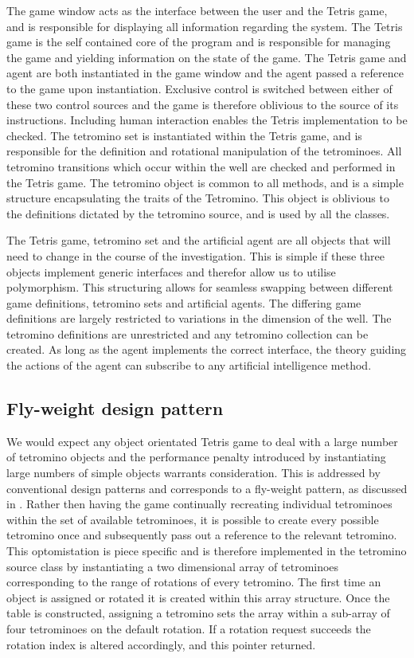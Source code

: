 \documentclass{rucsthesis}
\begin{document}
The game window acts as the interface between the user and the Tetris game, and is responsible for displaying all information regarding the system. The Tetris game is the self contained core of the program and is responsible for managing the game and yielding information on the state of the game. The Tetris game and agent are both instantiated in the game window and the agent passed a reference to the game upon instantiation. Exclusive control is switched between either of these two control sources and the game is therefore oblivious to the source of its instructions.  Including human interaction enables the Tetris implementation to be checked. The tetromino set is instantiated within the Tetris game, and is responsible for the definition and rotational manipulation of the tetrominoes. All tetromino transitions which occur within the well are checked and performed in the Tetris game. The tetromino object is common to all methods, and is a simple structure encapsulating the traits of the Tetromino. This object is oblivious to the definitions dictated by the tetromino source, and is used by all the classes.

The Tetris game, tetromino set and the artificial agent are all objects that will need to change in the course of the investigation. This is simple if these three objects implement generic interfaces and therefor allow us to utilise polymorphism. This structuring allows for seamless swapping between different game definitions, tetromino sets and artificial agents. The differing game definitions are largely restricted to variations in the dimension of the well. The tetromino definitions are unrestricted and any tetromino collection can be created. As long as the agent implements the correct interface, the theory guiding the actions of the agent can subscribe to any artificial intelligence method.

\subsection{Fly-weight design pattern}

We would expect any object orientated Tetris game to deal with a large number of tetromino objects and the performance penalty introduced by instantiating large numbers of simple objects warrants consideration. This is addressed by conventional design patterns and corresponds to a fly-weight pattern, as discussed in \cite{designp}. Rather then having the game continually recreating individual tetrominoes within the set of available tetrominoes, it is possible to create every possible tetromino once and subsequently pass out a reference to the relevant tetromino. This optomistation is piece specific and is therefore implemented in the tetromino source class by instantiating a two dimensional array of tetrominoes corresponding to the range of rotations of every tetromino. The first time an object is assigned or rotated it is created within this array structure. Once the table is constructed, assigning a tetromino sets the array within a sub-array of four tetrominoes on the default rotation. If a rotation request succeeds the rotation index is altered accordingly, and this pointer returned.
\end{document}
